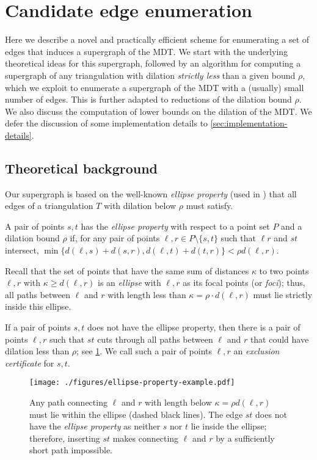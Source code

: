 \section{Candidate edge enumeration}
\label{sec:edge-enumeration}

Here we describe a novel and practically efficient scheme for
enumerating a set of edges that induces a supergraph of the MDT.
We start with the underlying theoretical ideas for this supergraph, followed
by an algorithm for computing a supergraph of any triangulation with dilation \emph{strictly less} than a given bound $\rho$,
which we exploit to enumerate a supergraph of the MDT with a (usually) small number of edges.
This is further adapted to reductions of the dilation bound $\rho$.
We also discuss the computation of lower bounds on the dilation of the MDT.
We defer the discussion of some implementation details to \cref{sec:implementation-details}.

\subsection{Theoretical background}
Our supergraph is based on the well-known \emph{ellipse property} (used in \cite{DBLP:conf/cccg/BrandtGSR14,DBLP:journals/ijcga/GiannopoulosKKKM10,DBLP:conf/ewcg/KnauerM05}) that all edges of a triangulation $T$ with dilation below $\rho$ must satisfy.

\begin{definition}
  A pair of points $s, t$ has the \emph{ellipse property} with 
  respect to a point set $P$ and a dilation bound $\rho$ if, for
  any pair of points $\ell, r \in P \setminus \{s,t\}$ such that
  $\ell r$ and $st$ intersect, $\min \{d(\ell,s) + d(s,r), d(\ell,t) + d(t,r)\} < \rho d(\ell,r)$. 
\end{definition}

Recall that the set of points that have the same sum of distances $\kappa$ to 
two points $\ell, r$ with $\kappa \geq d(\ell,r)$ is an \emph{ellipse} with $\ell, r$ as its focal points (or \emph{foci});
thus, all paths between $\ell$ and $r$ with length less than $\kappa = \rho \cdot d(\ell,r)$ must lie strictly inside this ellipse.

If a pair of points $s,t$ does not have the ellipse property, then there is a pair of points $\ell, r$
such that $st$ cuts through all paths between $\ell$ and $r$ that could have dilation less than $\rho$; see \cref{fig:ellipse-property-example}.
We call such a pair of points $\ell, r$ an \emph{exclusion certificate} for $s,t$.
\begin{figure}%
  \centering
  \texttt{[image: ./figures/ellipse-property-example.pdf]}
  \caption{
    Any path connecting $\ell$ and $r$ with length below $\kappa = \rho d(\ell,r)$ must lie within the ellipse (dashed black lines).
    The edge $st$ does not have the \emph{ellipse property} as neither $s$ nor $t$ lie inside the ellipse;
    therefore, inserting $st$ makes connecting $\ell$ and $r$ by a sufficiently short path impossible.
  }
  \label{fig:ellipse-property-example}
\end{figure}%

